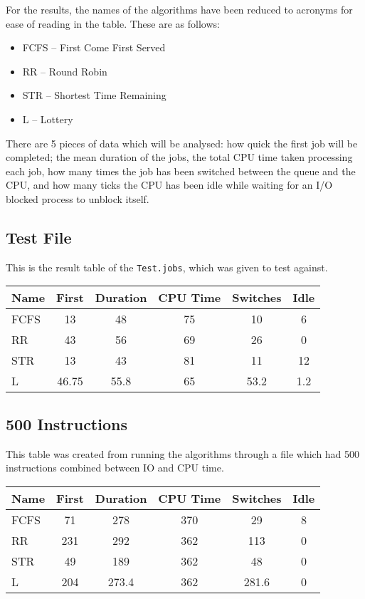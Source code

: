 \documentclass{acm_proc_article-sp}
\begin{document}
For the results, the names of the algorithms have been reduced to acronyms for ease of reading in the table. These are as follows:

\begin{itemize}
  \item FCFS -- First Come First Served
  \item RR -- Round Robin
  \item STR -- Shortest Time Remaining
  \item L -- Lottery
\end{itemize}

There are 5 pieces of data which will be analysed: how quick the first job will be completed; the mean duration of the jobs, the total CPU time taken processing each job, how many times the job has been switched between the queue and the CPU, and how many ticks the CPU has been idle while waiting for an I/O blocked process to unblock itself.


\subsection{Test File}

This is the result table of the \texttt{Test\-.jobs}, which was given to test against. 

\begin{tabular}{| l | c | c | c | c | c |}
  \hline
  Name & First & Duration & CPU Time & Switches &  Idle \\
  \hline
  FCFS & 13 & 48 & 75 & 10 & 6 \\
  RR & 43 & 56 & 69 & 26 & 0 \\
  STR & 13 & 43 & 81 & 11 & 12 \\
  L & 46.75  & 55.8 & 65 & 53.2 & 1.2 \\
  \hline
\end{tabular}


\subsection{500 Instructions}

This table was created from running the algorithms through a file which had 500 instructions combined between IO and CPU time.

\begin{tabular}{| l | c | c | c | c | c |}
  \hline
  Name & First & Duration & CPU Time & Switches &  Idle \\
  \hline
  FCFS & 71 & 278 & 370 & 29 & 8 \\
  RR & 231 & 292 & 362 & 113 & 0 \\
  STR & 49 & 189 & 362 & 48 & 0 \\
  L & 204 & 273.4 & 362 & 281.6 & 0 \\
  \hline
\end{tabular}
\end{document}
